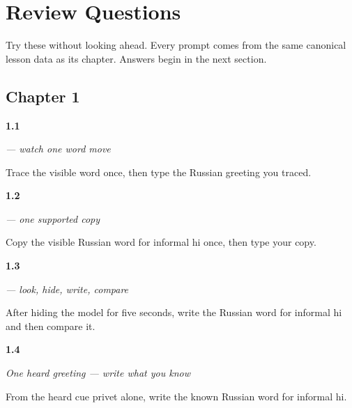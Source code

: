 
\chapter*{Review Questions}

Try these without looking ahead. Every prompt comes from the same canonical lesson data as its chapter. Answers begin in the next section.

\section*{Chapter 1}

\noindent\begin{minipage}[t]{\linewidth}
\raggedright
\hypertarget{review-RU-W05-privet-observe-check}{\textbf{1.1}} \emph{ — watch one word move}\par
\small Trace the visible word once, then type the Russian greeting you traced.
\end{minipage}\par\medskip

\noindent\begin{minipage}[t]{\linewidth}
\raggedright
\hypertarget{review-RU-W05-privet-guided-copy-check}{\textbf{1.2}} \emph{ — one supported copy}\par
\small Copy the visible Russian word for informal hi once, then type your copy.
\end{minipage}\par\medskip

\noindent\begin{minipage}[t]{\linewidth}
\raggedright
\hypertarget{review-RU-W05-privet-delayed-copy-check}{\textbf{1.3}} \emph{ — look, hide, write, compare}\par
\small After hiding the model for five seconds, write the Russian word for informal hi and then compare it.
\end{minipage}\par\medskip

\noindent\begin{minipage}[t]{\linewidth}
\raggedright
\hypertarget{review-RU-W05-privet-dictation-answer}{\textbf{1.4}} \emph{One heard greeting — write what you know}\par
\small From the heard cue privet alone, write the known Russian word for informal hi.
\end{minipage}\par\medskip

